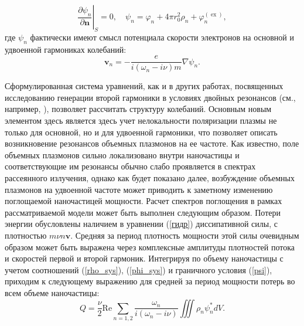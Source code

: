 \documentclass[12pt, a4paper]{article}
\renewcommand{\vec}{\mathbf}
\def \w {\omega}
\def \ph {\varphi}
\def \ex { \operatorname{ex}}
\newcommand{\dn}[1]{\left.\frac{\partial #1}{\partial \vec{n}}\right|_{ S}}
\begin{document}
\begin{equation} 
	\label{psi}
\dn{\psi_n}	= 0, \quad \psi_n = \ph_n + 4 \pi r_0^2 \rho_n + \ph^{(\ex)}_n, 
\end{equation}
где $\psi_{n}$ фактически имеют смысл потенциала скорости электронов на основной и удвоенной гармониках колебаний:
\begin{equation} 
	\label{v}
	\vec{v}_n = -\frac{e}{i(\w_n - i\nu)m} \nabla \psi_n.
\end{equation}

Сформулированная система уравнений, как и в других работах, посвященных исследованию генерации второй гармоники в условиях двойных резонансов (см., например, \cite{Ai2021, Panoiu2018, Beer2022}), позволяет рассчитать структуру колебаний. Основным новым элементом здесь является здесь учет нелокальности поляризации плазмы не только для основной, но и для удвоенной гармоники, что позволяет описать возникновение резонансов объемных плазмонов на ее частоте. Как известно, поле объемных плазмонов сильно локализовано внутри наночастицы и соответствующие им резонансы обычно слабо проявляется в спектрах рассеянного излучения, однако как будет показано далее, возбуждение объемных плазмонов на удвоенной частоте может приводить к заметному изменению поглощаемой наночастицей мощности. Расчет спектров поглощения в рамках рассматриваемой модели может быть выполнен следующим образом. Потери энергии обусловлены наличием в уравнении (\ref{гидр}) диссипативной силы, с плотностью $m \nu n \vec{v}$. Средняя за период плотность мощности этой силы очевидным образом может быть выражена через комплексные амплитуды плотностей потока и скоростей первой и второй гармоник. Интегрируя по объему наночастицы с учетом соотношений (\ref{rho_sys}), (\ref{phi_sys}) и граничного условия (\ref{psi}), приходим к следующему выражению для средней за период мощности потерь во всем объеме наночастицы: 
\begin{equation} 
	\label{Q}
	Q = \frac{\nu}{2}\mathrm{Re}  \sum_{n=1,2}\frac{\w_n}{i(\w_n - i \nu)}\iiint\rho_n \psi_n^* dV.
\end{equation}
\end{document}
